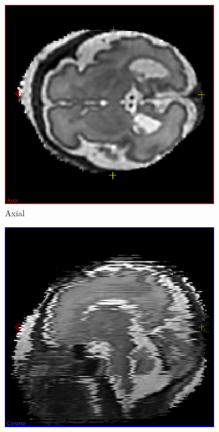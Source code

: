 \begin{figure}[H]
  \centering
  \begin{subfigure}[b]{0.358\textwidth}
    \includegraphics[width=\textwidth]{images/reconstruction/axial.png}
    \caption*{Axial}
    \label{fig:reconstructionaxial}
  \end{subfigure}%
  \begin{subfigure}[b]{0.358\textwidth}
    \includegraphics[width=\textwidth]{images/reconstruction/sagittal.png}

\end{subfigure}
\end{figure}

